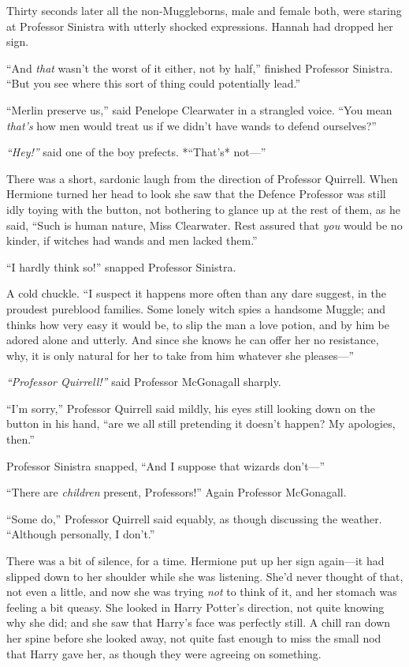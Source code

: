 Thirty seconds later all the non-Muggleborns, male and female both, were
staring at Professor Sinistra with utterly shocked expressions. Hannah
had dropped her sign.

``And \emph{that} wasn't the worst of it either, not by half,'' finished
Professor Sinistra. ``But you see where this sort of thing could
potentially lead.''

``Merlin preserve us,'' said Penelope Clearwater in a strangled voice.
``You mean \emph{that's} how men would treat us if we didn't have wands
to defend ourselves?''

\emph{``Hey!''} said one of the boy prefects. *``That's* not---''

There was a short, sardonic laugh from the direction of Professor
Quirrell. When Hermione turned her head to look she saw that the Defence
Professor was still idly toying with the button, not bothering to glance
up at the rest of them, as he said, ``Such is human nature, Miss
Clearwater. Rest assured that \emph{you} would be no kinder, if witches
had wands and men lacked them.''

``I hardly think so!'' snapped Professor Sinistra.

A cold chuckle. ``I suspect it happens more often than any dare suggest,
in the proudest pureblood families. Some lonely witch spies a handsome
Muggle; and thinks how very easy it would be, to slip the man a love
potion, and by him be adored alone and utterly. And since she knows he
can offer her no resistance, why, it is only natural for her to take
from him whatever she pleases---''

\emph{``Professor Quirrell!''} said Professor McGonagall sharply.

``I'm sorry,'' Professor Quirrell said mildly, his eyes still looking
down on the button in his hand, ``are we all still pretending it doesn't
happen? My apologies, then.''

Professor Sinistra snapped, ``And I suppose that wizards don't---''

``There are \emph{children} present, Professors!'' Again Professor
McGonagall.

``Some do,'' Professor Quirrell said equably, as though discussing the
weather. ``Although personally, I don't.''

There was a bit of silence, for a time. Hermione put up her sign
again---it had slipped down to her shoulder while she was listening.
She'd never thought of that, not even a little, and now she was trying
\emph{not} to think of it, and her stomach was feeling a bit queasy. She
looked in Harry Potter's direction, not quite knowing why she did; and
she saw that Harry's face was perfectly still. A chill ran down her
spine before she looked away, not quite fast enough to miss the small
nod that Harry gave her, as though they were agreeing on something.

